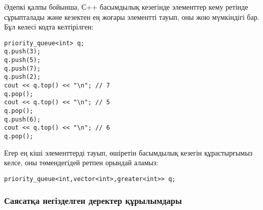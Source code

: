 \begin{samepage}
Әдепкі қалпы бойынша, С++ басымдылық кезегінде элементтер кему ретінде сұрыпталады
және кезектен ең жоғары элементті тауып, оны жою мүмкіндігі бар.
Бұл келесі кодта келтірілген:

\begin{lstlisting}
priority_queue<int> q;
q.push(3);
q.push(5);
q.push(7);
q.push(2);
cout << q.top() << "\n"; // 7
q.pop();
cout << q.top() << "\n"; // 5
q.pop();
q.push(6);
cout << q.top() << "\n"; // 6
q.pop();
\end{lstlisting}
\end{samepage}

\newpage

Егер ең кіші элементтерді тауып, өшіретін 
басымдылық кезегін құрастырғымыз келсе,
оны төмендегідей ретпен орындай аламыз:

\begin{lstlisting}
priority_queue<int,vector<int>,greater<int>> q;
\end{lstlisting}

\subsubsection{Саясатқа негізделген деректер құрылымдары}

